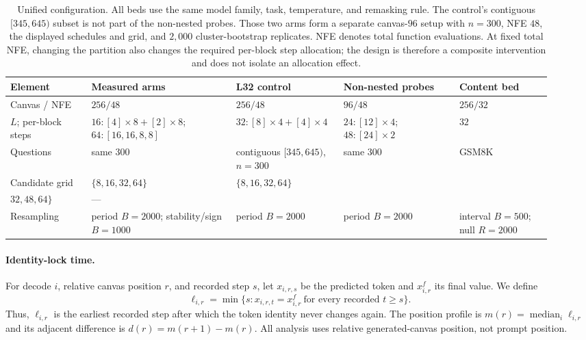 \documentclass{article}
\begin{document}
\begin{table}[t]
\centering
\footnotesize
\setlength{\tabcolsep}{2.2pt}
\begin{tabular}{@{}>{\raggedright\arraybackslash}p{0.14\linewidth}
                  >{\raggedright\arraybackslash}p{0.25\linewidth}
                  >{\raggedright\arraybackslash}p{0.17\linewidth}
                  >{\raggedright\arraybackslash}p{0.20\linewidth}
                  >{\raggedright\arraybackslash}p{0.16\linewidth}@{}}
\toprule
Element & Measured arms & L32 control & Non-nested probes & Content bed \\
\midrule
Canvas / NFE & $256/48$ & $256/48$ & $96/48$ & $256/32$ \\
$L$; per-block steps & $16:[4]{\times}8+[2]{\times}8$; $64:[16,16,8,8]$ & $32:[8]{\times}4+[4]{\times}4$ & $24:[12]{\times}4$; $48:[24]{\times}2$ & $32$ \\
Questions & same $300$ & contiguous $[345,645)$, $n{=}300$ & same $300$ & GSM8K \\
Candidate grid & $\{8,16,32,64\}$ & $\{8,16,32,64\}$ & \shortstack[l]{$\{8,16,24,$\\$32,48,64\}$} & --- \\
Resampling & period $B{=}2000$; stability/sign $B{=}1000$ & period $B{=}2000$ & period $B{=}2000$ & interval $B{=}500$; null $R{=}2000$ \\
\bottomrule
\end{tabular}
\caption{Unified configuration. All beds use the same model family, task,
temperature, and remasking rule. The control's contiguous $[345,645)$ subset is
not part of the non-nested probes. Those two arms form a separate canvas-$96$
setup with $n{=}300$, NFE $48$, the displayed schedules and grid, and $2{,}000$
cluster-bootstrap replicates. NFE denotes total function evaluations. At fixed
total NFE, changing the partition also changes the required per-block step
allocation; the design is therefore a composite intervention and does not isolate
an allocation effect.}
\label{tab:setup}
\end{table}

\paragraph{Identity-lock time.}
For decode $i$, relative canvas position $r$, and recorded step $s$, let
$x_{i,r,s}$ be the predicted token and $x^f_{i,r}$ its final value. We define
\begin{equation}
\ell_{i,r}=\min\{s:x_{i,r,t}=x^f_{i,r}\ \text{for every recorded }t\ge s\}.
\label{eq:lock}
\end{equation}
Thus, $\ell_{i,r}$ is the earliest recorded step after which the token identity
never changes again. The position profile is $m(r)=\operatorname{median}_i
\ell_{i,r}$ and its adjacent difference is $d(r)=m(r+1)-m(r)$. All analysis uses
relative generated-canvas position, not prompt position.
\end{document}
